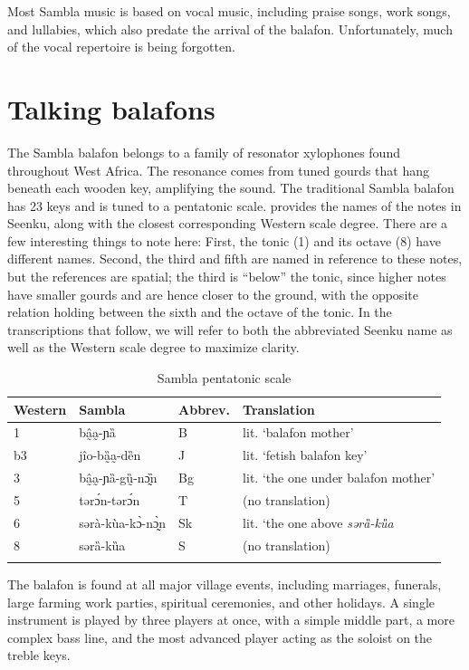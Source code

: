\documentclass[output=paper]{langscibook}
\begin{document}
Most Sambla music is based on vocal music, including praise songs, work songs, and lullabies, which also predate the arrival of the balafon. Unfortunately, much of the vocal repertoire is being forgotten. 


\section{Talking balafons}\label{sec-balafon}

The Sambla balafon belongs to a family of resonator xylophones found throughout West Africa. The resonance comes from tuned gourds that hang beneath each wooden key, amplifying the sound. The traditional Sambla balafon has 23 keys and is tuned to a pentatonic scale.  provides the names of the notes in Seenku, along with the closest corresponding Western scale degree. There are a few interesting things to note here: First, the tonic (1) and its octave (8) have different names. Second, the third and fifth are named in reference to these notes, but the references are {\sc spatial}; the third is ``below'' the tonic, since higher notes have smaller gourds and are hence closer to the ground, with the opposite relation holding between the sixth and the octave of the tonic. In the transcriptions that follow, we will refer to both the abbreviated Seenku name as well as the Western scale degree to maximize clarity. 
 
\begin{table}
  \caption{Sambla pentatonic scale\label{tab:mcpherson:Sambla}}
  \begin{tabular}{llll} 
    \lsptoprule
Western & Sambla & Abbrev. & Translation \\ 
 \midrule
    1 & bâ̰a̰-ɲȁ & B &  lit. `balafon mother' \\
    b3 & jîo-bȁ̰a̰-dȅn & J & lit. `fetish balafon key' \\
    3 & bâ̰a̰-ɲȁ-gṵ̏-nɔ̰̏n & Bg & lit. `the one under balafon mother' \\
    5 & tərɔ́n-tərɔ́n & T &  (no translation) \\
    6 & sərà-kùa-kɔ̀-nɔ̰̀n & Sk &  lit. `the one above \textit{sərȁ-kȕa} \\
    8 & sərȁ-kȕa & S &  (no translation) \\ 
      \lspbottomrule
  \end{tabular}
\end{table}

The balafon is found at all major village events, including marriages, funerals, large farming work parties, spiritual ceremonies, and other holidays. A single instrument is played by three players at once, with a simple middle part, a more complex bass line, and the most advanced player acting as the soloist on the treble keys. 
\end{document}

